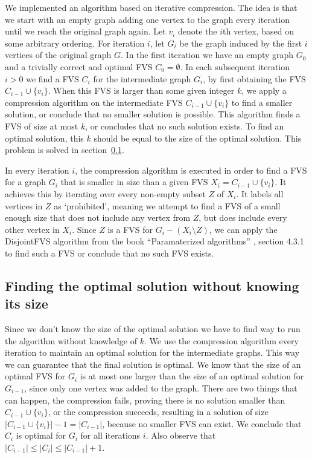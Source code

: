 We implemented an algorithm based on iterative compression. The idea is that we start with an empty graph adding one
vertex to the graph every iteration until we reach the original graph again. Let $v_i$ denote the $i$th vertex, based on
some arbitrary ordering. For iteration $i$, let $G_i$ be the graph induced by the first $i$ vertices of the original graph
$G$. In the first iteration we have an empty graph $G_0$ and a trivially correct and optimal FVS $C_0 = \emptyset$. In
each subsequent iteration $i>0$ we find a FVS $C_i$ for the intermediate graph $G_i$, by first obtaining the FVS $C_{i-1}
\cup \{v_i\}$. When this FVS is larger than some given integer $k$, we apply a compression algorithm on the intermediate
FVS $C_{i-1} \cup \{v_i\}$ to find a smaller solution, or conclude that no smaller solution is possible. This algorithm
finds a FVS of size at most $k$, or concludes that no such solution exists. To find an optimal solution, this $k$ should
be equal to the size of the optimal solution. This problem is solved in section~\ref{sec:noK}.

In every iteration $i$, the compression algorithm is executed in order to find a FVS for a graph $G_i$ that is smaller in
size than a given FVS $X_i = C_{i-1} \cup \{v_i\}$. It achieves this by iterating over every non-empty subset $Z$ of
$X_i$. It labels all vertices in $Z$ as `prohibited', meaning we attempt to find a FVS of a small enough size that does
not include any vertex from $Z$, but does include every other vertex in $X_i$. Since $Z$ is a FVS for $G_i-(X_i\setminus
Z)$, we can apply the {\sc DisjointFVS} algorithm from the book ``Paramaterized algorithms'' \cite{ftpbook}, section 4.3.1
to find such a FVS or conclude that no such FVS exists.

\subsection{Finding the optimal solution without knowing its size} \label{sec:noK}
Since we don't know the size of the optimal solution we have to find way to run the algorithm without knowledge of $k$. We
use the compression algorithm every iteration to maintain an optimal solution for the intermediate graphs. This way we can
guarantee that the final solution is optimal. We know that the size of an optimal FVS for $G_i$ is at most one larger than
the size of an optimal solution for $G_{i-1}$, since only one vertex was added to the graph. There are two things that can
happen, the compression fails, proving there is no solution smaller than $C_{i-1} \cup \{v_i\}$, or the compression
succeeds, resulting in a solution of size $|C_{i-1} \cup \{v_i\}|-1 = |C_{i-1}|$, because no smaller FVS can exist. We
conclude that $C_i$ is optimal for $G_i$ for all iterations $i$. Also observe that $|C_{i-1}| \leq |C_i| \leq |C_{i-1}|
+1$.

